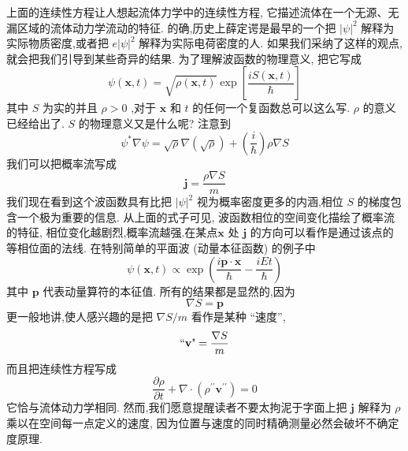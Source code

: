 上面的连续性方程让人想起流体力学中的连续性方程, 它描述流体在一个无源、无漏区域的流体动力学流动的特征. 的确,历史上薛定谔是最早的一个把 ${\left| \psi \right| }^{2}$ 解释为实际物质密度,或者把 $e{\left| \psi \right| }^{2}$ 解释为实际电荷密度的人. 如果我们采纳了这样的观点,就会把我们引导到某些奇异的结果.
为了理解波函数的物理意义, 把它写成
\begin{equation}
\psi \left( {\mathbf{x}, t}\right) = \sqrt{\rho \left( {\mathbf{x}, t}\right) }\exp \left\lbrack \frac{{iS}\left( {\mathbf{x}, t}\right) }{\hbar }\right\rbrack
\end{equation}
其中 $S$ 为实的并且 $\rho > 0$ ,对于 $\mathbf{x}$ 和 $t$ 的任何一个复函数总可以这么写. $\rho$ 的意义已经给出了. $S$ 的物理意义又是什么呢? 注意到
\begin{equation}
{\psi }^{ * }\nabla \psi = \sqrt{\rho }\nabla \left( \sqrt{\rho }\right) + \left( \frac{i}{\hbar }\right) \rho \nabla S
\end{equation}
我们可以把概率流写成
\begin{equation}
\mathbf{j} = \frac{\rho \nabla S}{m}
\end{equation}
我们现在看到这个波函数具有比把 ${\left| \psi \right| }^{2}$ 视为概率密度更多的内涵,相位 $S$ 的梯度包含一个极为重要的信息. 从上面的式子可见, 波函数相位的空间变化描绘了概率流的特征, 相位变化越剧烈,概率流越强.在某点$\mathbf{x}$ 处 $\mathbf{j}$ 的方向可以看作是通过该点的等相位面的法线. 在特别简单的平面波 (动量本征函数) 的例子中
\begin{equation}
\psi \left( {\mathbf{x}, t}\right) \propto \exp \left( {\frac{i\mathbf{p} \cdot \mathbf{x}}{\hbar } - \frac{iEt}{\hbar }}\right) 
\end{equation}
其中 $\mathbf{p}$ 代表动量算符的本征值. 所有的结果都是显然的,因为
\begin{equation}
\nabla S = \mathbf{p}
\end{equation}
更一般地讲,使人感兴趣的是把 $\nabla S/m$ 看作是某种 “速度”,
\begin{equation}
\text{``\textbf{v}"}= \frac{\nabla S}{m}
\end{equation}
而且把连续性方程写成
\begin{equation}
\frac{\partial \rho }{\partial t} + \nabla \cdot \left( {{\rho }^{\prime \prime }{\mathbf{v}}^{\prime \prime }}\right) = 0
\end{equation}
它恰与流体动力学相同. 然而,我们愿意提醒读者不要太拘泥于字面上把 $\mathbf{j}$ 解释为 $\rho$ 乘以在空间每一点定义的速度, 因为位置与速度的同时精确测量必然会破坏不确定度原理.
